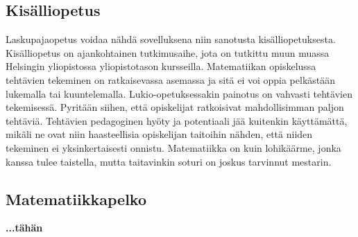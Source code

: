 \subsection{Kisälliopetus}
Laskupajaopetus voidaa nähdä sovelluksena niin sanotusta kisälliopetuk\-sesta. Kisälliopetus on ajankohtainen tutkimusaihe, jota on tutkittu muun muassa Helsingin yliopistossa yliopistotason kursseilla. Matematiikan opiske\-lussa tehtävien tekeminen on ratkaisevassa asemassa ja sitä ei voi oppia pelkästään lukemalla tai kuuntelemalla. Lukio-opetuksessakin painotus on vahvasti tehtävien tekemisessä. Pyritään siihen, että opiskelijat ratkoisivat mahdollisimman paljon tehtäviä. Tehtävien pedagoginen hyöty ja potentiaali jää kuitenkin käyttämättä, mikäli ne ovat niin haasteellisia opiskelijan taitoihin nähden, että niiden tekeminen ei yksinkertaisesti onnistu. Mate\-ma\-tiikka on kuin lohikäärme, jonka kanssa tulee taistella, mutta taitavinkin soturi on joskus tarvinnut mestarin.
\subsection{Matematiikkapelko}
\textbf{...tähän}
\cite{mathanx}
